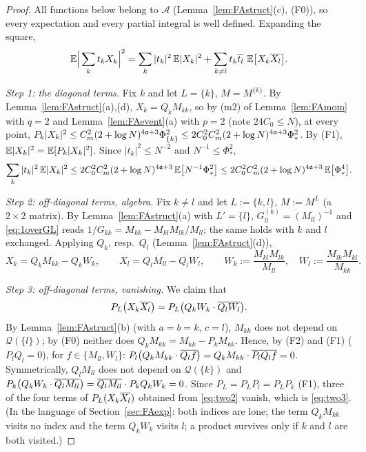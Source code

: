 \begin{proof}
All functions below belong to $\mathcal A$ (Lemma~\ref{lem:FAstruct}(c), (F0)), so every expectation and every partial integral is well defined. Expanding the square,
\begin{equation}\label{eq:two0}
 \mathbb{E}\Big|\sum_kt_kX_k\Big|^2=\sum_k|t_k|^2\,\mathbb{E}|X_k|^2+\sum_{k\ne l}t_k\overline{t_l}\ \mathbb{E}\big[X_k\overline{X_l}\big].
\end{equation}

\emph{Step 1: the diagonal terms.} Fix $k$ and let $L=\{k\}$, $M=M^{\{k\}}$. By Lemma~\ref{lem:FAstruct}(a),(d), $X_k=Q_kM_{kk}$, so by (m2) of Lemma~\ref{lem:FAmom} with $q=2$ and Lemma~\ref{lem:FAevent}(a) with $p=2$ (note $24C_0\le N$), at every point,
$P_k|X_k|^2\le C_m^2(2+\log N)^{4\mathfrak{a}+3}\Phi_{\{k\}}^2\le2C_0^2C_m^2(2+\log N)^{4\mathfrak{a}+3}\Phi_*^2$. By (F1), $\mathbb{E}|X_k|^2=\mathbb{E}[P_k|X_k|^2]$. Since $|t_k|^2\le N^{-2}$ and $N^{-1}\le\Phi_*^2$,
\begin{equation}\label{eq:two1}
 \sum_k|t_k|^2\,\mathbb{E}|X_k|^2\le2C_0^2C_m^2(2+\log N)^{4\mathfrak{a}+3}\,\mathbb{E}\big[N^{-1}\Phi_*^2\big]\le2C_0^2C_m^2(2+\log N)^{4\mathfrak{a}+3}\,\mathbb{E}\big[\Phi_*^4\big].
\end{equation}

\emph{Step 2: off-diagonal terms, algebra.} Fix $k\ne l$ and let $L:=\{k,l\}$, $M:=M^L$ (a $2\times2$ matrix). By Lemma~\ref{lem:FAstruct}(a) with $L'=\{l\}$, $G^{(k)}_{ll}=(M_{ll})^{-1}$ and \eqref{eq:1overGL} reads
$1/G_{kk}=M_{kk}-M_{kl}M_{lk}/M_{ll}$; the same holds with $k$ and $l$ exchanged. Applying $Q_k$, resp.\ $Q_l$ (Lemma~\ref{lem:FAstruct}(d)),
\begin{equation}\label{eq:two2}
 X_k=Q_kM_{kk}-Q_kW_k,\qquad X_l=Q_lM_{ll}-Q_lW_l,\qquad W_k:=\frac{M_{kl}M_{lk}}{M_{ll}},\quad W_l:=\frac{M_{lk}M_{kl}}{M_{kk}}.
\end{equation}

\emph{Step 3: off-diagonal terms, vanishing.} We claim that
\begin{equation}\label{eq:two3}
 P_L\big(X_k\overline{X_l}\big)=P_L\big(Q_kW_k\cdot\overline{Q_lW_l}\big).
\end{equation}
By Lemma~\ref{lem:FAstruct}(b) (with $a=b=k$, $c=l$), $M_{kk}$ does not depend on $\mathcal Q(\{l\})$; by (F0) neither does $Q_kM_{kk}=M_{kk}-P_kM_{kk}$. Hence, by (F2) and (F1) ($P_lQ_l=0$), for $f\in\{M_{ll},W_l\}$:
$P_l\big(Q_kM_{kk}\cdot\overline{Q_lf}\big)=Q_kM_{kk}\cdot\overline{P_lQ_lf}=0$. Symmetrically, $Q_lM_{ll}$ does not depend on $\mathcal Q(\{k\})$ and $P_k\big(Q_kW_k\cdot\overline{Q_lM_{ll}}\big)=\overline{Q_lM_{ll}}\cdot P_kQ_kW_k=0$.
Since $P_L=P_LP_l=P_LP_k$ (F1), three of the four terms of $P_L(X_k\overline{X_l})$ obtained from \eqref{eq:two2} vanish, which is \eqref{eq:two3}.
(In the language of Section~\ref{sec:FAexp}: both indices are lone; the term $Q_kM_{kk}$ visits no index and the term $Q_kW_k$ visits $l$; a product survives only if $k$ and $l$ are both visited.)


\end{proof}
